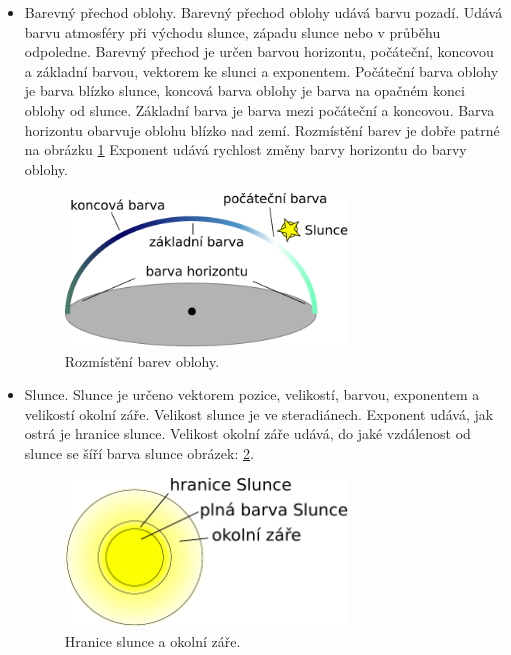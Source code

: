 \begin{itemize}
\item Barevný přechod oblohy.
Barevný přechod oblohy udává barvu pozadí.
Udává barvu atmosféry při východu slunce, západu slunce nebo v průběhu odpoledne.
Barevný přechod je určen barvou horizontu, počáteční, koncovou a základní barvou, vektorem ke slunci a exponentem.
Počáteční barva oblohy je barva blízko slunce, koncová barva oblohy je barva na opačném konci oblohy od slunce.
Základní barva je barva mezi počáteční a koncovou.
Barva horizontu obarvuje oblohu blízko nad zemí.
Rozmístění barev je dobře patrné na obrázku \ref{fig:skyboxgrad}
Exponent udává rychlost změny barvy horizontu do barvy oblohy.
\begin{figure}[h]
\centering
\includegraphics[width=7.5cm,keepaspectratio]{obr/skyboxgrad.pdf}
\caption{Rozmístění barev oblohy.}
\label{fig:skyboxgrad}
\end{figure}

\item Slunce.
Slunce je určeno vektorem pozice, velikostí, barvou, exponentem a velikostí okolní záře.
Velikost slunce je ve steradiánech.
Exponent udává, jak ostrá je hranice slunce.
Velikost okolní záře udává, do jaké vzdálenost od slunce se šíří barva slunce obrázek: \ref{fig:skyboxsun}.
\begin{figure}[h]
\centering
\includegraphics[width=7.5cm,keepaspectratio]{obr/skyboxsun.pdf}
\caption{Hranice slunce a okolní záře.}
\label{fig:skyboxsun}
\end{figure}


\end{itemize}
